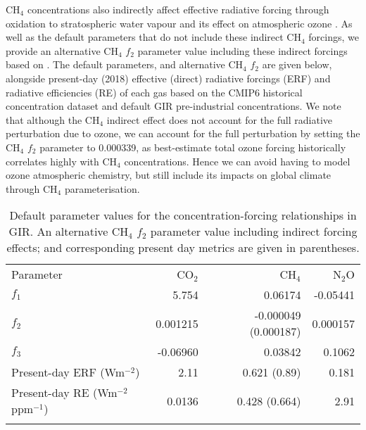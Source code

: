 \documentclass[gmd, manuscript]{copernicus}
\begin{document}
CH$_4$ concentrations also indirectly affect effective radiative forcing through oxidation to stratospheric water vapour and its effect on atmospheric ozone \citep{Noel2018,Owens1982,Myhre2013a}. As well as the default parameters that do not include these indirect CH$_4$ forcings, we provide an alternative CH$_4$ $f_2$ parameter value including these indirect forcings based on \cite{Myhre2013a}. The default parameters, and alternative CH$_4$ $f_2$ are given below, alongside present-day (2018) effective (direct) radiative forcings (ERF) and radiative efficiencies (RE) of each gas based on the CMIP6 historical concentration dataset \citep{Meinshausen2017} and default GIR pre-industrial concentrations. We note that although the CH$_4$ indirect effect does not account for the full radiative perturbation due to ozone, we can account for the full perturbation by setting the CH$_4$ $f_2$ parameter to 0.000339, as best-estimate total ozone forcing historically correlates highly with CH$_4$ concentrations. Hence we can avoid having to model ozone atmospheric chemistry, but still include its impacts on global climate through CH$_4$ parameterisation.
\begin{table}[t]
    \caption{Default parameter values for the concentration-forcing relationships in GIR. An alternative CH$_4$ $f_2$ parameter value including indirect forcing effects; and corresponding present day metrics are given in parentheses.} \label{tab:forcparameters}
    \begin{tabular}{l r r r}
    \tophline
    Parameter & CO$_2$ & CH$_4$ & N$_2$O\\
    \middlehline
    $f_1$ & 5.754 & 0.06174 & -0.05441 \\
    $f_2$ & 0.001215 & -0.000049 (0.000187) & 0.000157 \\
    $f_3$ & -0.06960 & 0.03842 & 0.1062 \\
    \middlehline
    Present-day ERF (Wm$^{-2}$) & 2.11 & 0.621 (0.89) & 0.181 \\
    Present-day RE (Wm$^{-2}$ppm$^{-1}$) & 0.0136 & 0.428 (0.664) & 2.91 \\
    \bottomhline
    \end{tabular}
    \belowtable{} %
\end{table}
\end{document}
